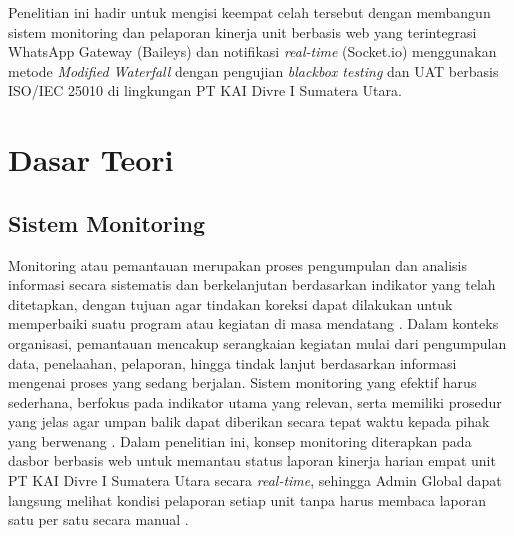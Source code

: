 Penelitian ini hadir untuk mengisi keempat celah tersebut dengan membangun sistem monitoring dan pelaporan kinerja unit berbasis web yang terintegrasi WhatsApp Gateway (Baileys) dan notifikasi \textit{real-time} (Socket.io) menggunakan metode \textit{Modified Waterfall} dengan pengujian \textit{blackbox testing} dan UAT berbasis ISO/IEC 25010 di lingkungan PT KAI Divre I Sumatera Utara. \par

\section{Dasar Teori} \label{II.Teori}

\subsection{Sistem Monitoring} \label{II.Monitoring}
Monitoring atau pemantauan merupakan proses pengumpulan dan analisis informasi secara sistematis dan berkelanjutan berdasarkan indikator yang telah ditetapkan, dengan tujuan agar tindakan koreksi dapat dilakukan untuk memperbaiki suatu program atau kegiatan di masa mendatang \cite{bimantara2023monitoring}. Dalam konteks organisasi, pemantauan mencakup serangkaian kegiatan mulai dari pengumpulan data, penelaahan, pelaporan, hingga tindak lanjut berdasarkan informasi mengenai proses yang sedang berjalan. Sistem monitoring yang efektif harus sederhana, berfokus pada indikator utama yang relevan, serta memiliki prosedur yang jelas agar umpan balik dapat diberikan secara tepat waktu kepada pihak yang berwenang \cite{bimantara2023monitoring}. Dalam penelitian ini, konsep monitoring diterapkan pada dasbor berbasis web untuk memantau status laporan kinerja harian empat unit PT KAI Divre I Sumatera Utara secara \textit{real-time}, sehingga Admin Global dapat langsung melihat kondisi pelaporan setiap unit tanpa harus membaca laporan satu per satu secara manual \cite{lutfiyah2025dashboard}. \par

